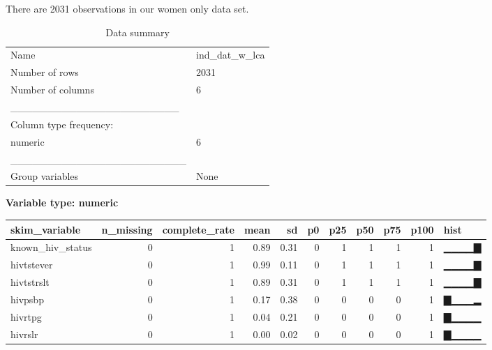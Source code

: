 \documentclass[
]{article}
\newenvironment{Shaded}{\begin{snugshade}}{\end{snugshade}}
\newcommand{\DataTypeTok}[1]{\textcolor[rgb]{0.13,0.29,0.53}{#1}}
\newcommand{\DecValTok}[1]{\textcolor[rgb]{0.00,0.00,0.81}{#1}}
\newcommand{\KeywordTok}[1]{\textcolor[rgb]{0.13,0.29,0.53}{\textbf{#1}}}
\newcommand{\NormalTok}[1]{#1}
\newcommand{\OperatorTok}[1]{\textcolor[rgb]{0.81,0.36,0.00}{\textbf{#1}}}
\newcommand{\StringTok}[1]{\textcolor[rgb]{0.31,0.60,0.02}{#1}}
\begin{document}
There are 2031 observations in our women only data set.

\begin{Shaded}
\end{Shaded}

\begin{longtable}[]{@{}ll@{}}
\caption{Data summary}\tabularnewline
\toprule
\endhead
Name & ind\_dat\_w\_lca\tabularnewline
Number of rows & 2031\tabularnewline
Number of columns & 6\tabularnewline
\_\_\_\_\_\_\_\_\_\_\_\_\_\_\_\_\_\_\_\_\_\_\_ &\tabularnewline
Column type frequency: &\tabularnewline
numeric & 6\tabularnewline
\_\_\_\_\_\_\_\_\_\_\_\_\_\_\_\_\_\_\_\_\_\_\_\_ &\tabularnewline
Group variables & None\tabularnewline
\bottomrule
\end{longtable}

\textbf{Variable type: numeric}

\begin{longtable}[]{@{}lrrrrrrrrrl@{}}
\toprule
skim\_variable & n\_missing & complete\_rate & mean & sd & p0 & p25 &
p50 & p75 & p100 & hist\tabularnewline
\midrule
\endhead
known\_hiv\_status & 0 & 1 & 0.89 & 0.31 & 0 & 1 & 1 & 1 & 1 &
▁▁▁▁▇\tabularnewline
hivtstever & 0 & 1 & 0.99 & 0.11 & 0 & 1 & 1 & 1 & 1 &
▁▁▁▁▇\tabularnewline
hivtstrslt & 0 & 1 & 0.89 & 0.31 & 0 & 1 & 1 & 1 & 1 &
▁▁▁▁▇\tabularnewline
hivpsbp & 0 & 1 & 0.17 & 0.38 & 0 & 0 & 0 & 0 & 1 & ▇▁▁▁▂\tabularnewline
hivrtpg & 0 & 1 & 0.04 & 0.21 & 0 & 0 & 0 & 0 & 1 & ▇▁▁▁▁\tabularnewline
hivrslr & 0 & 1 & 0.00 & 0.02 & 0 & 0 & 0 & 0 & 1 & ▇▁▁▁▁\tabularnewline
\bottomrule
\end{longtable}
\end{document}
